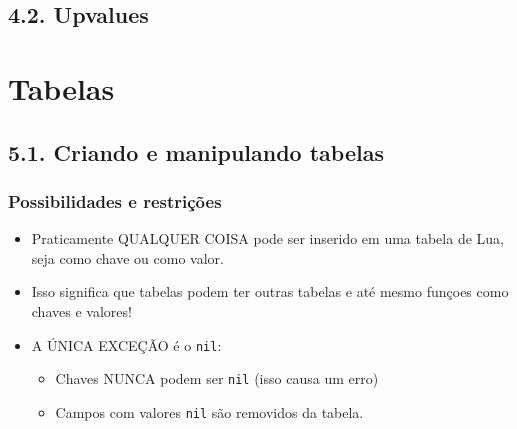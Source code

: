 \documentclass[brazil]{beamer}
\begin{document}
\subsection{4.2. Upvalues}
\section{Tabelas}
\subsection{5.1. Criando e manipulando tabelas}
\begin{frame}[fragile]
  \frametitle{Possibilidades e restrições}
  \begin{itemize}
    \pause
    \item Praticamente QUALQUER COISA pode ser inserido em uma
          tabela de Lua, seja como chave ou como valor.
    \pause
    \item Isso significa que tabelas podem ter outras tabelas e
          até mesmo funçoes como chaves e valores!
    \pause
    \item A ÚNICA EXCEÇÃO é o \verb$nil$:
    \begin{itemize}
      \pause
      \item Chaves NUNCA podem ser \verb$nil$ (isso causa um erro)
      \pause
      \item Campos com valores \verb$nil$ são removidos da tabela.
    \end{itemize}
  \end{itemize}
\end{frame}
\end{document}
